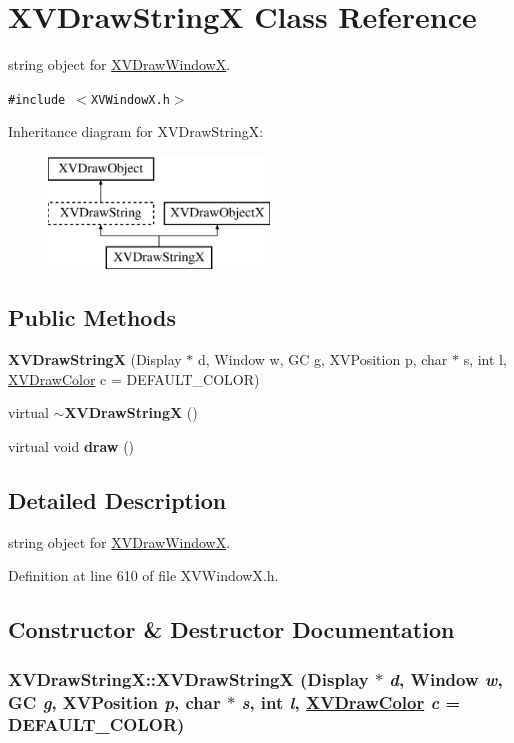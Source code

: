 \hypertarget{class_XVDrawStringX}{
\section{XVDraw\-String\-X  Class Reference}
\label{XVDrawStringX}
}
string object for \hyperlink{class_XVDrawWindowX}{XVDraw\-Window\-X}. 


{\tt \#include $<$XVWindow\-X.h$>$}

Inheritance diagram for XVDraw\-String\-X:\begin{figure}[H]
\begin{center}
\leavevmode
\includegraphics[height=3cm]{class_XVDrawStringX}
\end{center}
\end{figure}
\subsection*{Public Methods}
\begin{CompactItemize}
\item 
{\bf XVDraw\-String\-X} (Display $\ast$ d, Window w, GC g, XVPosition p, char $\ast$ s, int l, \hyperlink{class_XVDrawColor}{XVDraw\-Color} c = DEFAULT\_\-COLOR)
\item 
virtual {\bf $\sim$XVDraw\-String\-X} ()
\item 
virtual void {\bf draw} ()
\end{CompactItemize}


\subsection{Detailed Description}
string object for \hyperlink{class_XVDrawWindowX}{XVDraw\-Window\-X}.





Definition at line 610 of file XVWindow\-X.h.

\subsection{Constructor \& Destructor Documentation}
\label{XVDrawStringX_a0}
\hypertarget{class_XVDrawStringX_a0}{
\subsubsection[XVDrawStringX]{\setlength{\rightskip}{0pt plus 5cm}XVDraw\-String\-X::XVDraw\-String\-X (Display $\ast$ {\em d}, Window {\em w}, GC {\em g}, XVPosition {\em p}, char $\ast$ {\em s}, int {\em l}, \hyperlink{class_XVDrawColor}{XVDraw\-Color} {\em c} = DEFAULT\_\-COLOR)}}




